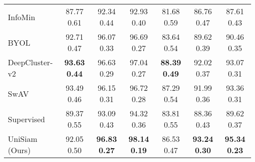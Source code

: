 \documentclass[runningheads]{llncs}
\begin{document}
\begin{table}[t]
{\begin{tabular}{lccc|ccc}
    InfoMin             &              87.77  0.61 &              92.34  0.44 &              92.93  0.40 &              81.68  0.59 &              86.76  0.47 &              87.61  0.43 \\
    BYOL                &              92.71  0.47 &              96.07  0.33 &              96.69  0.27 &              83.64  0.54 &              89.62  0.39 &              90.46  0.35 \\
    DeepCluster-v2      &     \textbf{93.63  0.44} &     96.63  0.29  &     97.04  0.27 &     \textbf{88.39  0.49} &     92.02  0.37 &  93.07  0.31 \\
    SwAV                &   93.49  0.46 & 96.15  0.31 & 96.72  0.28 & 87.29  0.54 & 91.99  0.36 &   93.36  0.31 \\
    Supervised          &              89.37  0.55 &              93.09  0.43 &              94.32  0.36 &              83.81  0.55 &              88.36  0.43 &              89.62  0.37 \\
        \midrule
   UniSiam (Ours)  & 92.05  0.50 & \textbf{96.83  0.27} & \textbf{98.14  0.19} & 86.53  0.47 & \textbf{93.24  0.30} & \textbf{95.34  0.23} \\
    \bottomrule
    \end{tabular}
    
}
    \resizebox{0.9\textwidth}{!}{

}
\end{table}
\end{document}
